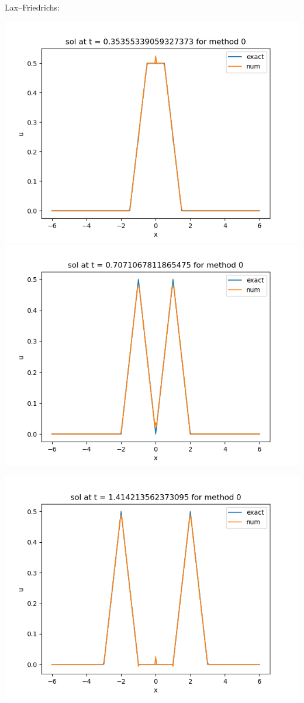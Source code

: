 \documentclass{article}
\begin{document}
\begin{enumerate}[label=(\alph*)]
Lax--Friedrichs:
\begin{center}
	\includegraphics[scale=.4]{hw11 sol n = 10 method 0}
	\includegraphics[scale=.4]{hw11 sol n = 20 method 0}
\end{center}
\begin{center}
	\includegraphics[scale=.4]{hw11 sol n = 40 method 0}

\end{center}
\end{enumerate}
\end{document}
